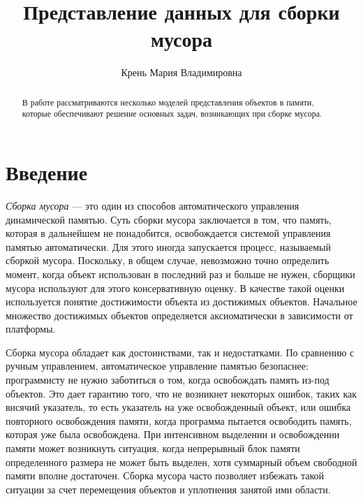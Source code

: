 \title{Представление данных для сборки мусора}
%
\author{Крень Мария Владимировна}
%
%
%

\maketitle              %

\begin{abstract}
В работе рассматриваются несколько моделей представления объектов
в памяти, которые обеспечивают решение основных задач, возникающих
при сборке мусора.
\end{abstract}
%

\section*{Введение}

\emph{Сборка мусора} --- это один из способов автоматического управления динамической памятью.
Суть сборки мусора заключается в том, что память, которая в дальнейшем не понадобится, освобождается системой управления памятью автоматически. 
Для этого иногда запускается процесс, называемый сборкой  мусора.
Поскольку, в общем случае, невозможно точно определить момент, когда объект использован в последний раз и
больше не нужен, сборщики мусора используют для этого консервативную оценку.
В качестве такой оценки используется понятие достижимости объекта из достижимых объектов. 
Начальное множество достижимых объектов определяется аксиоматически в зависимости от платформы.

Сборка мусора обладает как достоинствами, так и недостатками.
По сравнению с ручным управлением, автоматическое управление памятью безопаснее: программисту не нужно 
заботиться о том, когда освобождать память из-под объектов. 
Это дает гарантию того, что не возникнет некоторых ошибок, таких как
висячий указатель, то есть указатель на уже освобожденный объект, или ошибка повторного освобождения памяти, 
когда программа пытается освободить память, которая уже  была освобождена.
При интенсивном выделении и освобождении памяти может возникнуть ситуация,
когда непрерывный блок памяти определенного размера не может быть выделен,
хотя суммарный объем свободной памяти вполне достаточен. Сборка мусора часто позволяет избежать такой
ситуации за счет перемещения объектов и уплотнения занятой ими области.

